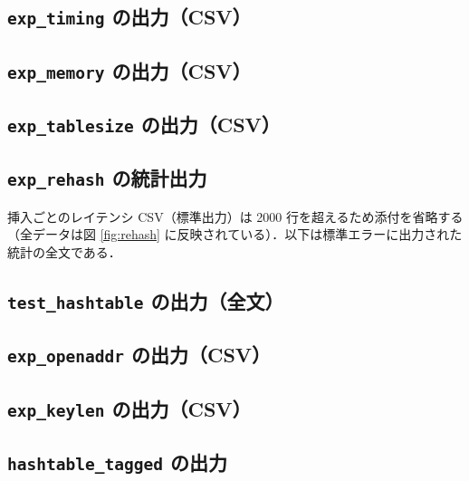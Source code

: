 \subsection{{\tt exp\_timing} の出力（CSV）}
{\scriptsize}

\subsection{{\tt exp\_memory} の出力（CSV）}
{\scriptsize}

\subsection{{\tt exp\_tablesize} の出力（CSV）}
{\scriptsize}

\subsection{{\tt exp\_rehash} の統計出力}

挿入ごとのレイテンシ CSV（標準出力）は 2000 行を超えるため添付を省略する（全データは図 \ref{fig:rehash} に反映されている）．以下は標準エラーに出力された統計の全文である．

{\scriptsize}

\subsection{{\tt test\_hashtable} の出力（全文）}
{\scriptsize}

\subsection{{\tt exp\_openaddr} の出力（CSV）}
{\scriptsize}

\subsection{{\tt exp\_keylen} の出力（CSV）}
{\scriptsize}

\subsection{{\tt hashtable\_tagged} の出力}
{\scriptsize}

